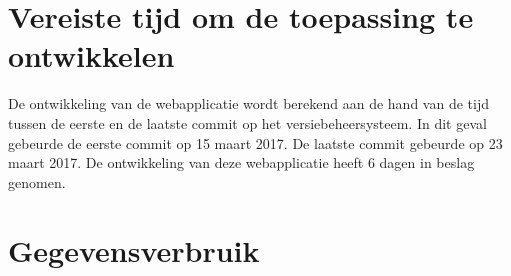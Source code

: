\section{Vereiste tijd om de toepassing te ontwikkelen}
De ontwikkeling van de webapplicatie wordt berekend aan de hand van de tijd tussen de eerste en de laatste commit op het
versiebeheersysteem. In dit geval gebeurde de eerste commit op 15 maart 2017. De laatste commit gebeurde op 23 maart 2017.
De ontwikkeling van deze webapplicatie heeft 6 dagen in beslag genomen.

\section{Gegevensverbruik}
